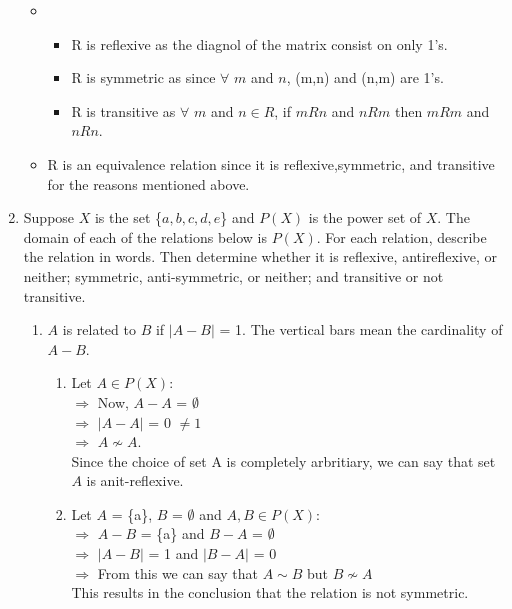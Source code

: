 \documentclass{article}
\begin{document}
\begin{enumerate}
\begin{itemize}
    \item \begin{itemize}
        \item R is reflexive as the diagnol of the matrix consist on only 1's.
        \item R is symmetric as since $\forall$ $m$ and $n$, (m,n) and (n,m) are 1's.
        \item R is transitive as $\forall$ $m$ and $n \in R$, if $mRn$ and $nRm$ 
        then $mRm$ and $nRn$.
     \end{itemize}
    \item R is an equivalence relation since it is reflexive,symmetric, and transitive for 
    the reasons mentioned above.
\end{itemize}

\pagebreak %

\item Suppose $X$ is the set \{$a,b,c,d,e$\} and $P(X)$ is the power set of $X$. 
The domain of each of the relations below is $P(X)$. 
For each relation, describe the relation in words. Then determine whether it is 
reflexive, antireflexive, or neither; symmetric, anti-symmetric, or neither; and 
transitive or not transitive.

\begin{enumerate}
    \item $A$ is related to $B$ if $\lvert A-B \rvert$ = 1. The 
    vertical bars mean the cardinality of $A - B$.
    \begin{enumerate}

        \item Let $A \in P(X)$:\\
              $\Rightarrow$ Now, $A - A$ = $\emptyset$\\
              $\Rightarrow$ $\left\lvert A - A\right\rvert$ = 0 $\neq 1$\\
              $\Rightarrow$ $A \nsim A$.\\
              Since the choice of set A is completely arbritiary, we can say that set $A$ is 
              anit-reflexive.\\

        \item Let $A$ = \{a\}, $B$ = $\emptyset$ and $A,B \in P(X)$:\\
             $\Rightarrow$ $A-B$ = \{a\} and $B-A$ = $\emptyset$\\
             $\Rightarrow$ $\left\lvert A - B\right\rvert$ = 1 and $\left\lvert B - A\right\rvert$ = 0\\
             $\Rightarrow$ From this we can say that $A \sim B$ but $B \nsim A$\\
             This results in the conclusion that the relation is not symmetric.\\


\end{enumerate}
\end{enumerate}
\end{enumerate}
\end{document}
